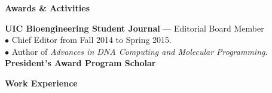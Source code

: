 \documentclass[11pt]{article}
\newcommand{\sectionheader}[1]{\noindent \textbf{\large #1}}
\newenvironment{sectionbody}{\begin{adjustwidth}{6mm}{}}{\end{adjustwidth}}
\begin{document}
\vspace{2mm}

\sectionheader{Awards \& Activities}
\begin{sectionbody}
{\bf UIC Bioengineering Student Journal} --- Editorial Board Member \\
$\bullet$ Chief Editor from Fall 2014 to Spring 2015. \\
$\bullet$ Author of {\it Advances in DNA Computing and Molecular Programming}. \\
{\bf President's Award Program Scholar}
\end{sectionbody}

\vspace{2mm}

\sectionheader{Work Experience}
\end{document}

